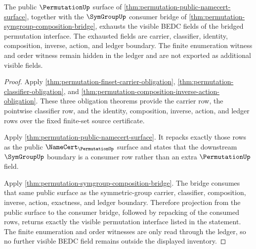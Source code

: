 \begin{theorem}\label{thm:permutation-bridged-surface-completeness}
The public $\PermutationUp$ surface of \autoref{thm:permutation-public-namecert-surface}, together with the $\SymGroupUp$ consumer bridge of \autoref{thm:permutation-symgroup-composition-bridge}, exhausts the visible BEDC fields of the bridged permutation interface. The exhausted fields are carrier, classifier, identity, composition, inverse, action, and ledger boundary. The finite enumeration witness and order witness remain hidden in the ledger and are not exported as additional visible fields.
\end{theorem}
\begin{proof}
Apply \autoref{thm:permutation-finset-carrier-obligation}, \autoref{thm:permutation-classifier-obligation}, and \autoref{thm:permutation-composition-inverse-action-obligation}. These three obligation theorems provide the carrier row, the pointwise classifier row, and the identity, composition, inverse, action, and ledger rows over the fixed finite-set source certificate.

Apply \autoref{thm:permutation-public-namecert-surface}. It repacks exactly those rows as the public $\NameCert_{\PermutationUp}$ surface and states that the downstream $\SymGroupUp$ boundary is a consumer row rather than an extra $\PermutationUp$ field.

Apply \autoref{thm:permutation-symgroup-composition-bridge}. The bridge consumes that same public surface as the symmetric-group carrier, classifier, composition, inverse, action, exactness, and ledger boundary. Therefore projection from the public surface to the consumer bridge, followed by repacking of the consumed rows, returns exactly the visible permutation interface listed in the statement. The finite enumeration and order witnesses are only read through the ledger, so no further visible BEDC field remains outside the displayed inventory.
\end{proof}

